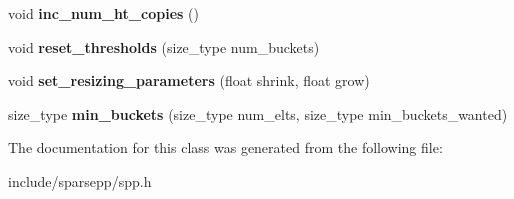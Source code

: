 \begin{DoxyCompactItemize}
\item 
void {\bfseries inc\+\_\+num\+\_\+ht\+\_\+copies} ()\hypertarget{classspp___1_1sparsehash__internal_1_1sh__hashtable__settings_aadeb27e742db125d5485cef998c37d05}{}\label{classspp___1_1sparsehash__internal_1_1sh__hashtable__settings_aadeb27e742db125d5485cef998c37d05}

\item 
void {\bfseries reset\+\_\+thresholds} (size\+\_\+type num\+\_\+buckets)\hypertarget{classspp___1_1sparsehash__internal_1_1sh__hashtable__settings_a068a5481ab5e82e2a1ea9b1cd46f9d39}{}\label{classspp___1_1sparsehash__internal_1_1sh__hashtable__settings_a068a5481ab5e82e2a1ea9b1cd46f9d39}

\item 
void {\bfseries set\+\_\+resizing\+\_\+parameters} (float shrink, float grow)\hypertarget{classspp___1_1sparsehash__internal_1_1sh__hashtable__settings_aac61000835265ff3e10111910ea1a99d}{}\label{classspp___1_1sparsehash__internal_1_1sh__hashtable__settings_aac61000835265ff3e10111910ea1a99d}

\item 
size\+\_\+type {\bfseries min\+\_\+buckets} (size\+\_\+type num\+\_\+elts, size\+\_\+type min\+\_\+buckets\+\_\+wanted)\hypertarget{classspp___1_1sparsehash__internal_1_1sh__hashtable__settings_a0ea66114fef9d1ed03cada5d16d7cede}{}\label{classspp___1_1sparsehash__internal_1_1sh__hashtable__settings_a0ea66114fef9d1ed03cada5d16d7cede}

\end{DoxyCompactItemize}


The documentation for this class was generated from the following file\+:\begin{DoxyCompactItemize}
\item 
include/sparsepp/spp.\+h\end{DoxyCompactItemize}

